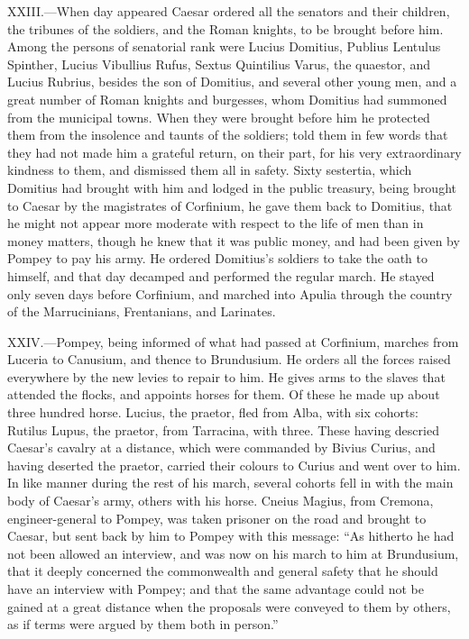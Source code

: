XXIII.—When day appeared Caesar ordered all the senators and their
children, the tribunes of the soldiers, and the Roman knights, to be
brought before him. Among the persons of senatorial rank were Lucius
Domitius, Publius Lentulus Spinther, Lucius Vibullius Rufus, Sextus
Quintilius Varus, the quaestor, and Lucius Rubrius, besides the son of
Domitius, and several other young men, and a great number of Roman
knights and burgesses, whom Domitius had summoned from the municipal
towns. When they were brought before him he protected them from the
insolence and taunts of the soldiers; told them in few words that they
had not made him a grateful return, on their part, for his very
extraordinary kindness to them, and dismissed them all in safety. Sixty
sestertia, which Domitius had brought with him and lodged in the public
treasury, being brought to Caesar by the magistrates of Corfinium, he
gave them back to Domitius, that he might not appear more moderate with
respect to the life of men than in money matters, though he knew that it
was public money, and had been given by Pompey to pay his army. He
ordered Domitius's soldiers to take the oath to himself, and that day
decamped and performed the regular march. He stayed only seven days
before Corfinium, and marched into Apulia through the country of the
Marrucinians, Frentanians, and Larinates.

XXIV.—Pompey, being informed of what had passed at Corfinium, marches
from Luceria to Canusium, and thence to Brundusium. He orders all the
forces raised everywhere by the new levies to repair to him. He gives
arms to the slaves that attended the flocks, and appoints horses for
them. Of these he made up about three hundred horse. Lucius, the
praetor, fled from Alba, with six cohorts: Rutilus Lupus, the praetor,
from Tarracina, with three. These having descried Caesar's cavalry at a
distance, which were commanded by Bivius Curius, and having deserted the
praetor, carried their colours to Curius and went over to him. In like
manner during the rest of his march, several cohorts fell in with the
main body of Caesar's army, others with his horse. Cneius Magius, from
Cremona, engineer-general to Pompey, was taken prisoner on the road and
brought to Caesar, but sent back by him to Pompey with this message: ``As
hitherto he had not been allowed an interview, and was now on his march
to him at Brundusium, that it deeply concerned the commonwealth and
general safety that he should have an interview with Pompey; and that
the same advantage could not be gained at a great distance when the
proposals were conveyed to them by others, as if terms were argued by
them both in person.''

